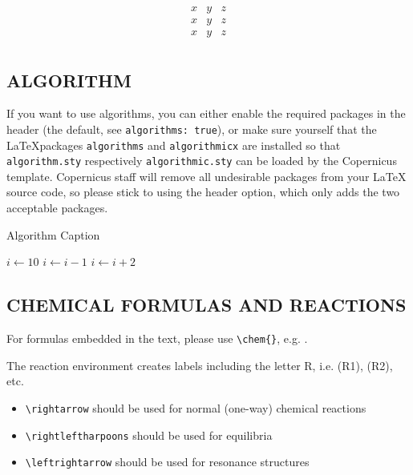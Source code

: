 \documentclass[gc, manuscript]{copernicus}
\begin{document}
\[
\begin{matrix}
x & y & z\\
x & y & z\\
x & y & z\\
\end{matrix}
\]

\subsection{ALGORITHM}

If you want to use algorithms, you can either enable the required packages in the header (the default, see \texttt{algorithms:\ true}), or make sure yourself that the \LaTeX packages \texttt{algorithms} and \texttt{algorithmicx} are installed so that \texttt{algorithm.sty} respectively \texttt{algorithmic.sty} can be loaded by the Copernicus template.
Copernicus staff will remove all undesirable packages from your LaTeX source code, so please stick to using the header option, which only adds the two acceptable packages.

\begin{algorithm}
\caption{Algorithm Caption}
\label{a1}
\begin{algorithmic}
\STATE $i\gets 10$
        \STATE $i\gets i-1$
\ELSE
                \STATE $i\gets i+2$
        \ENDIF
\ENDIF
\end{algorithmic}
\end{algorithm}

\subsection{CHEMICAL FORMULAS AND REACTIONS}

For formulas embedded in the text, please use \texttt{\textbackslash{}chem\{\}}, e.g. .

The reaction environment creates labels including the letter R, i.e. (R1), (R2), etc.

\begin{itemize}
\item
  \texttt{\textbackslash{}rightarrow} should be used for normal (one-way) chemical reactions
\item
  \texttt{\textbackslash{}rightleftharpoons} should be used for equilibria
\item
  \texttt{\textbackslash{}leftrightarrow} should be used for resonance structures
\end{itemize}
\end{document}
